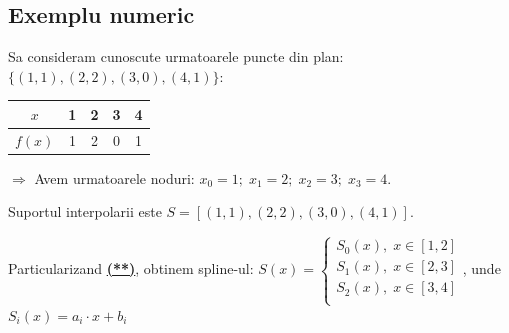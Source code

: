 \documentclass{article}
\begin{document}
\subsection{Exemplu numeric}
\tab Sa consideram cunoscute urmatoarele puncte din plan: $\{(1,1), (2,2), (3,0), (4,1)\}$:\\

\begin{tabular}{c | c | c | c | c}
    $x$ & 1 & 2 & 3 & 4 \\
    \hline
    $f(x)$ & 1 & 2 & 0 & 1  \\
\end{tabular}
$\Rightarrow$ Avem urmatoarele noduri: $x_0=1;\; x_1=2;\; x_2=3;\; x_3=4$.

Suportul interpolarii este $S=[(1,1), (2,2), (3,0), (4,1)]$.

Particularizand \hyperref[sec:liniare]{\textbf{(**)}}, obtinem spline-ul:
$S(x) = \begin{cases}
  S_0(x),\; x \in [1, 2]\\
  S_1(x),\; x \in [2, 3]\\
  S_2(x),\; x \in [3, 4]\\
\end{cases}$, unde $S_i(x) = a_i \cdot x + b_i$
\end{document}
